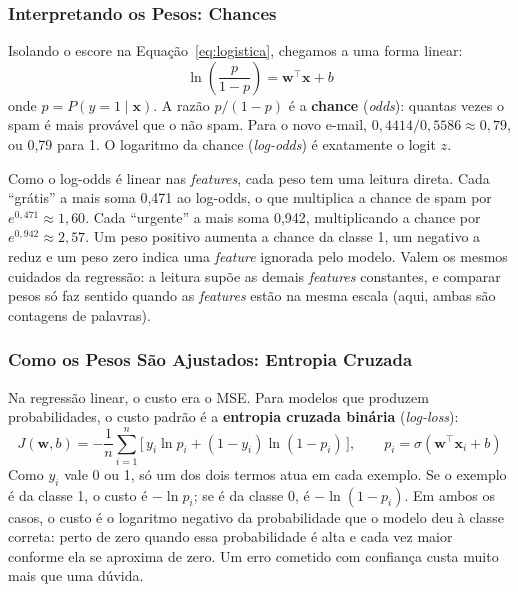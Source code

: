 \documentclass[a4paper,12pt,openany]{book}
\begin{document}
\subsubsection{Interpretando os Pesos: Chances}

Isolando o escore na Equação~\ref{eq:logistica}, chegamos a uma forma linear:
\begin{equation}
\ln\!\left(\frac{p}{1 - p}\right) = \mathbf{w}^\top \mathbf{x} + b
\end{equation}
onde \(p = P(y = 1 \mid \mathbf{x})\). A razão \(p/(1 - p)\) é a \textbf{chance} (\textit{odds}): quantas vezes o spam é mais provável que o não spam. Para o novo e-mail, \(0,4414 / 0,5586 \approx 0,79\), ou 0,79 para 1. O logaritmo da chance (\textit{log-odds}) é exatamente o logit \(z\).

Como o log-odds é linear nas \textit{features}, cada peso tem uma leitura direta. Cada ``grátis'' a mais soma 0,471 ao log-odds, o que multiplica a chance de spam por \(e^{0,471} \approx 1,60\). Cada ``urgente'' a mais soma 0,942, multiplicando a chance por \(e^{0,942} \approx 2,57\). Um peso positivo aumenta a chance da classe 1, um negativo a reduz e um peso zero indica uma \textit{feature} ignorada pelo modelo. Valem os mesmos cuidados da regressão: a leitura supõe as demais \textit{features} constantes, e comparar pesos só faz sentido quando as \textit{features} estão na mesma escala (aqui, ambas são contagens de palavras).

\subsubsection{Como os Pesos São Ajustados: Entropia Cruzada}

Na regressão linear, o custo era o MSE. Para modelos que produzem probabilidades, o custo padrão é a \textbf{entropia cruzada binária} (\textit{log-loss}):
\begin{equation}\label{eq:entropia_cruzada}
J(\mathbf{w}, b) = -\frac{1}{n} \sum_{i=1}^{n} \Big[\, y_i \ln p_i + (1 - y_i) \ln(1 - p_i) \,\Big], \qquad p_i = \sigma(\mathbf{w}^\top \mathbf{x}_i + b)
\end{equation}
Como \(y_i\) vale 0 ou 1, só um dos dois termos atua em cada exemplo. Se o exemplo é da classe 1, o custo é \(-\ln p_i\); se é da classe 0, é \(-\ln(1 - p_i)\). Em ambos os casos, o custo é o logaritmo negativo da probabilidade que o modelo deu à classe correta: perto de zero quando essa probabilidade é alta e cada vez maior conforme ela se aproxima de zero. Um erro cometido com confiança custa muito mais que uma dúvida.
\end{document}
